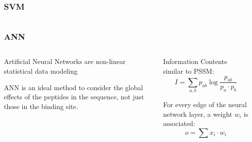 \documentclass[presentation]{beamer}   %
\begin{document}
\begin{frame}
 \frametitle{SVM}
 
 \begin{columns}
  \begin{column}{5cm}
   \begin{block}\centering
 
   \end{block}
   \pause
   \begin{block}\centering

   \end{block}
   \pause
  \end{column}
  \begin{column}{5cm}
   \begin{block}\centering

   \end{block}
   \pause
   \begin{block}\centering
   
   \end{block}
  \end{column}
 \end{columns}
\end{frame}

\begin{frame}
 \frametitle{ANN}
 
  \begin{columns}
  \begin{column}{5cm}
   \begin{block}\centering
    Artificial Neural Networks are non-linear statistical data modeling
   \end{block}
   \pause
   \begin{block}\centering
    ANN is an ideal method to consider the global effects of the 
    peptides in the sequence, not just those in the binding site. 
   \end{block}
   \pause
  \end{column}
  \begin{column}{5cm}
   \begin{block}\centering
    Information Contents similar to PSSM:
    \begin{equation}
     I = \sum_{a,b}{ p_{ab}\log{ \frac{ p_{ab} }{ p_a \cdot p_b } } }
    \end{equation}
   \end{block}
   \pause
   \begin{block}\centering
   For every edge of the neural network layer, a weight $w_i$ is associated:
    \begin{equation}
     o = \sum{x_i \cdot w_i}
    \end{equation}
   \end{block}
  \end{column}
 \end{columns}
\end{frame}
\end{document}
